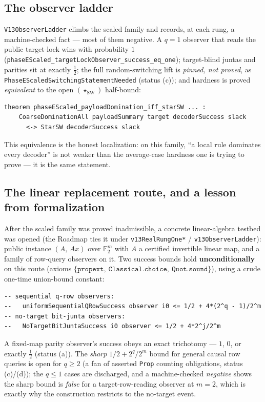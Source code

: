 \documentclass[11pt]{article}
\theoremstyle{definition}
\newcommand{\FF}{\mathbb{F}_2}
\newcommand{\StarSW}{(\star_{\mathrm{SW}})}
\begin{document}
\subsection{The observer ladder}
\texttt{V13ObserverLadder} climbs the scaled family and records, at each rung, a
machine-checked fact --- most of them negative. A $q=1$ observer that reads the
public target-lock wins with probability $1$
(\texttt{phaseEScaled\_targetLockObserver\_success\_eq\_one}); target-blind juntas
and parities sit at exactly $\tfrac12$; the full random-switching lift is
\emph{pinned, not proved}, as \texttt{PhaseEScaledSwitchingStatementNeeded}
(status (c)); and hardness is proved \emph{equivalent} to the open $\StarSW$
half-bound:
\begin{lstlisting}
theorem phaseEScaled_payloadDomination_iff_starSW ... :
    CoarseDominationAll payloadSummary target decoderSuccess slack
      <-> StarSW decoderSuccess slack
\end{lstlisting}
This equivalence is the honest localization: on this family, ``a local rule
dominates every decoder'' is not weaker than the average-case hardness one is
trying to prove --- it is the same statement.

\subsection{The linear replacement route, and a lesson from formalization}
\label{sec:truefirst}
After the scaled family was proved inadmissible, a concrete linear-algebra testbed
was opened (the Roadmap ties it under \texttt{v13RealRungOne*} /
\texttt{v13ObserverLadder}): public instance $(A,\,Ax)$ over $\FF^m$ with $A$ a
certified invertible linear map, and a family of row-query observers on it. Two
success bounds hold \textbf{unconditionally} on this route (axioms
$\{\texttt{propext},\ \texttt{Classical.choice},\ \texttt{Quot.sound}\}$), using a
crude one-time union-bound constant:
\begin{lstlisting}
-- sequential q-row observers:
--   uniformSequentialQRowSuccess observer i0 <= 1/2 + 4*(2^q - 1)/2^m
-- no-target bit-junta observers:
--   NoTargetBitJuntaSuccess i0 observer <= 1/2 + 4*2^j/2^m
\end{lstlisting}
A fixed-map parity observer's success obeys an exact trichotomy --- $1$, $0$, or
exactly $\tfrac12$ (status (a)). The \emph{sharp} $1/2+2^q/2^m$ bound for general
causal row queries is open for $q\ge 2$ (a fan of asserted \texttt{Prop} counting
obligations, status (c)/(d)); the $q\le 1$ cases are discharged, and a
machine-checked \emph{negative} shows the sharp bound is \emph{false} for a
target-row-reading observer at $m=2$, which is exactly why the construction restricts to
the no-target event.
\end{document}
